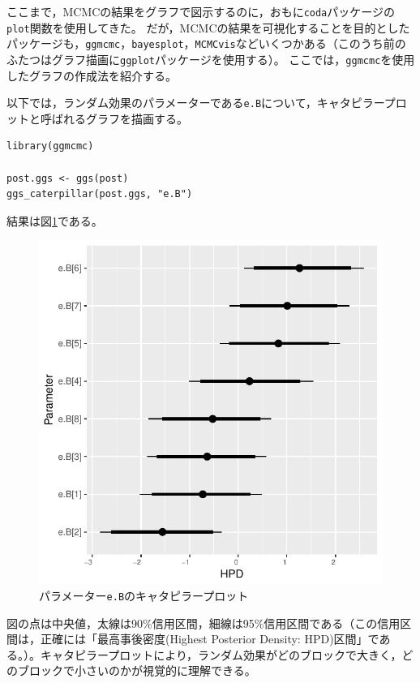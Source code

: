 \documentclass[11pt,uplatex]{jsarticle}
\begin{document}
ここまで，MCMCの結果をグラフで図示するのに，おもに\texttt{coda}パッケージの\texttt{plot}関数を使用してきた。
だが，MCMCの結果を可視化することを目的としたパッケージも，\texttt{ggmcmc}，\texttt{bayesplot}，\texttt{MCMCvis}などいくつかある（このうち前のふたつはグラフ描画に\texttt{ggplot}パッケージを使用する）。
ここでは，\texttt{ggmcmc}を使用したグラフの作成法を紹介する。

以下では，ランダム効果のパラメーターである\texttt{e.B}について，キャタピラープロットと呼ばれるグラフを描画する。

\begin{lstlisting}
library(ggmcmc)

post.ggs <- ggs(post)
ggs_caterpillar(post.ggs, "e.B")
\end{lstlisting}

結果は図\ref{example3_caterpillar}である。

\begin{figure}[hbtp]
  \begin{center}
    \includegraphics[bb=0 0 340 340, clip, width=320 bp]{example3_caterpillar.pdf}
  \end{center}
  \caption{パラメーター\texttt{e.B}のキャタピラープロット}
  \label{example3_caterpillar}
\end{figure}

\noindent
図の点は中央値，太線は90\%信用区間，細線は95\%信用区間である（この信用区間は，正確には「最高事後密度(Highest Posterior Density: HPD)区間」である。）。キャタピラープロットにより，ランダム効果がどのブロックで大きく，どのブロックで小さいのかが視覚的に理解できる。
\end{document}
